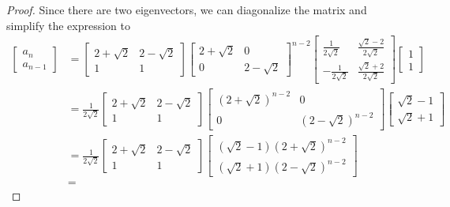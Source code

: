 \begin{proof}
    Since there are two eigenvectors, 
    we can diagonalize the matrix and 
    simplify the expression to
    \begin{align}
        \begin{bmatrix} a_n \\ a_{n-1} \end{bmatrix} 
        &=
        \begin{bmatrix}
            2+\sqrt{2}& 2-\sqrt{2} \\
            1 & 1
        \end{bmatrix}
        \begin{bmatrix}
            2+\sqrt{2} & 0 \\
            0 & 2-\sqrt{2}
        \end{bmatrix}^{n-2}
        \begin{bmatrix}
            \frac{1}{2\sqrt{2}} & \frac{\sqrt{2}-2}{2\sqrt{2}} \\
            -\frac{1}{2\sqrt{2}} & \frac{\sqrt{2}+2}{2\sqrt{2}}
        \end{bmatrix}
        \begin{bmatrix} 1 \\ 1 \end{bmatrix}\\
        &=
        \frac{1}{2\sqrt{2}}
        \begin{bmatrix}
            2+\sqrt{2}& 2-\sqrt{2} \\
            1 & 1
        \end{bmatrix}
        \begin{bmatrix}
            (2+\sqrt{2})^{n-2} & 0 \\
            0 & (2-\sqrt{2})^{n-2}
        \end{bmatrix}
        \begin{bmatrix} \sqrt{2}-1 \\ \sqrt{2}+1 \end{bmatrix}\\
        &=
        \frac{1}{2\sqrt{2}}
        \begin{bmatrix}
            2+\sqrt{2}& 2-\sqrt{2} \\
            1 & 1
        \end{bmatrix}
        \begin{bmatrix} 
            (\sqrt{2}-1)(2+\sqrt{2})^{n-2}\\ 
            (\sqrt{2}+1)(2-\sqrt{2})^{n-2}
        \end{bmatrix}\\
        &=

\end{align}
\end{proof}
